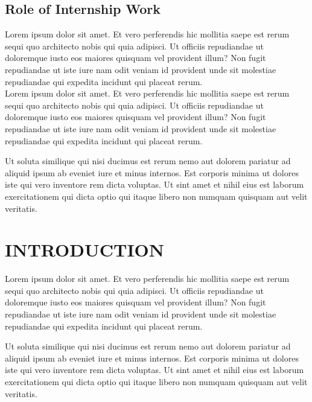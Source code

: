 \documentclass[12pt]{article}
\begin{document}
\subsection{Role of Internship Work}

Lorem ipsum dolor sit amet. Et vero perferendis hic mollitia saepe est rerum sequi quo architecto nobis qui quia adipisci. Ut officiis repudiandae ut doloremque iusto eos maiores quisquam vel provident illum? Non fugit repudiandae ut iste iure nam odit veniam id provident unde sit molestiae repudiandae qui expedita incidunt qui placeat rerum.\\

\noindent Lorem ipsum dolor sit amet. Et vero perferendis hic mollitia saepe est rerum sequi quo architecto nobis qui quia adipisci. Ut officiis repudiandae ut doloremque iusto eos maiores quisquam vel provident illum? Non fugit repudiandae ut iste iure nam odit veniam id provident unde sit molestiae repudiandae qui expedita incidunt qui placeat rerum.

Ut soluta similique qui nisi ducimus est rerum nemo aut dolorem pariatur ad aliquid ipsum ab eveniet iure et minus internos. Est corporis minima ut dolores iste qui vero inventore rem dicta voluptas. Ut sint amet et nihil eius est laborum exercitationem qui dicta optio qui itaque libero non numquam quisquam aut velit veritatis.\\

\newpage
\section{INTRODUCTION}

Lorem ipsum dolor sit amet. Et vero perferendis hic mollitia saepe est rerum sequi quo architecto nobis qui quia adipisci. Ut officiis repudiandae ut doloremque iusto eos maiores quisquam vel provident illum? Non fugit repudiandae ut iste iure nam odit veniam id provident unde sit molestiae repudiandae qui expedita incidunt qui placeat rerum.

Ut soluta similique qui nisi ducimus est rerum nemo aut dolorem pariatur ad aliquid ipsum ab eveniet iure et minus internos. Est corporis minima ut dolores iste qui vero inventore rem dicta voluptas. Ut sint amet et nihil eius est laborum exercitationem qui dicta optio qui itaque libero non numquam quisquam aut velit veritatis.\\
\end{document}
